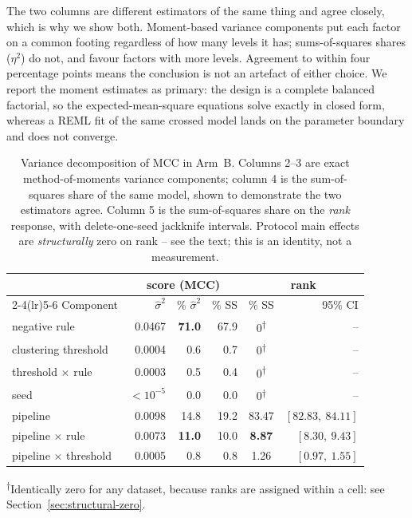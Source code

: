 \documentclass[11pt,a4paper]{article}
\begin{document}
The two columns are different estimators of the same thing and agree closely, which is why
we show both. Moment-based variance components put each factor on a common footing
regardless of how many levels it has; sums-of-squares shares ($\eta^2$) do not, and favour
factors with more levels. Agreement to within four percentage points means the conclusion
is not an artefact of either choice. We report the moment estimates as primary: the design
is a complete balanced factorial, so the expected-mean-square equations solve exactly in
closed form, whereas a REML fit of the same crossed model lands on the parameter boundary
and does not converge.

\begin{table}[htbp]\centering\small
\caption{Variance decomposition of MCC in Arm~B. Columns 2--3 are exact method-of-moments
variance components; column 4 is the sum-of-squares share of the same model, shown to
demonstrate the two estimators agree. Column 5 is the sum-of-squares share on the
\emph{rank} response, with delete-one-seed jackknife intervals. Protocol main effects are
\emph{structurally} zero on rank -- see the text; this is an identity, not a measurement.}
\label{tab:variance}
\begin{tabular}{lrrrcr}
\toprule
 & \multicolumn{3}{c}{score (MCC)} & \multicolumn{2}{c}{rank} \\
\cmidrule(lr){2-4}\cmidrule(lr){5-6}
Component & $\hat\sigma^2$ & \% $\hat\sigma^2$ & \% SS & \% SS & 95\% CI \\
\midrule
negative rule               & 0.0467 & \textbf{71.0} & 67.9 & $0$\textsuperscript{$\dagger$} & -- \\
clustering threshold        & 0.0004 &  0.6 &  0.7 & $0$\textsuperscript{$\dagger$} & -- \\
threshold $\times$ rule     & 0.0003 &  0.5 &  0.4 & $0$\textsuperscript{$\dagger$} & -- \\
seed                        & $<10^{-5}$ &  0.0 &  0.0 & $0$\textsuperscript{$\dagger$} & -- \\
\addlinespace
pipeline                    & 0.0098 & 14.8 & 19.2 & 83.47 & $[82.83,\ 84.11]$ \\
pipeline $\times$ rule      & 0.0073 & \textbf{11.0} & 10.0 & \textbf{8.87} & $[8.30,\ 9.43]$ \\
pipeline $\times$ threshold & 0.0005 &  0.8 &  0.8 & 1.26 & $[0.97,\ 1.55]$ \\
\bottomrule
\end{tabular}

\vspace{2pt}
\footnotesize\raggedright
\textsuperscript{$\dagger$}Identically zero for any dataset, because ranks are assigned
within a cell: see Section~\ref{sec:structural-zero}.
\end{table}
\end{document}
